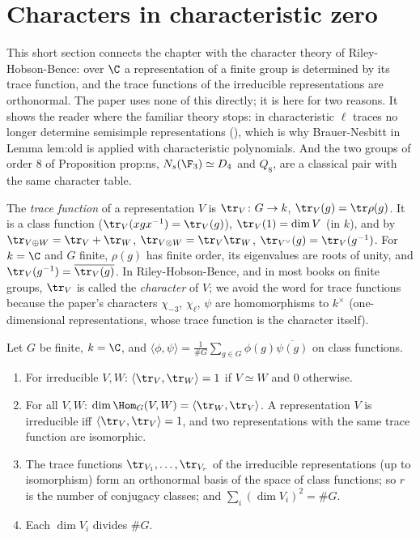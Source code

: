 \section{Characters in characteristic zero}\label{sec:reps:characters}

This short section connects the chapter with the character theory of Riley-Hobson-Bence: over $\C$ a representation of a finite
group is determined by its trace function, and the trace functions of the irreducible representations are orthonormal. The paper
uses none of this directly; it is here for two reasons. It shows the reader where the familiar theory stops: in characteristic $\ell$
traces no longer determine semisimple representations (), which is why Brauer-Nesbitt in Lemma lem:old is
applied with characteristic polynomials. And the two groups of order $8$ of Proposition prop:ns, $N_s(\F_3)\simeq D_4$ and $Q_8$, are a classical pair
with the same character table.

\begin{definition}\label{def:reps:trace-character}
The \emph{trace function} of a representation $V$ is $\tr_V\colon G\to k$, $\tr_V(g)=\tr\rho(g)$. It is a class function ($\tr_V(xgx^{-1})=\tr_V(g)$),
$\tr_V(1)=\dim V$ (in $k$), and by  $\tr_{V\oplus W}=\tr_V+\tr_W$, $\tr_{V\otimes W}=\tr_V\tr_W$, $\tr_{V^\vee}(g)=\tr_V(g^{-1})$. For
$k=\C$ and $G$ finite, $\rho(g)$ has finite order, its eigenvalues are roots of unity, and $\tr_V(g^{-1})=\overline{\tr_V(g)}$. In
Riley-Hobson-Bence, and in most books on finite groups, $\tr_V$ is called the \emph{character} of $V$; we avoid the word for trace
functions because the paper's characters $\chi_{-3}$, $\chi_\ell$, $\psi$ are homomorphisms to $k^\times$ (one-dimensional representations, whose trace
function is the character itself).
\end{definition}

\begin{theorem}[Orthogonality]\label{thm:reps:orthogonality}
Let $G$ be finite, $k=\C$, and $\langle\phi,\psi\rangle=\frac1{\#G}\sum_{g\in G}\phi(g)\overline{\psi(g)}$ on class functions.
\begin{enumerate}[label=(\roman*)]
\item For irreducible $V,W$: $\langle\tr_V,\tr_W\rangle=1$ if $V\simeq W$ and $0$ otherwise.
\item For all $V,W$: $\dim\Hom_G(V,W)=\langle\tr_W,\tr_V\rangle$. A representation $V$ is irreducible iff $\langle\tr_V,\tr_V\rangle=1$, and two
representations with the same trace function are isomorphic.
\item The trace functions $\tr_{V_1},\dots,\tr_{V_r}$ of the irreducible representations (up to isomorphism) form an orthonormal basis of
the space of class functions; so $r$ is the number of conjugacy classes; and $\sum_i(\dim V_i)^2=\#G$.
\item Each $\dim V_i$ divides $\#G$.
\end{enumerate}
\end{theorem}

